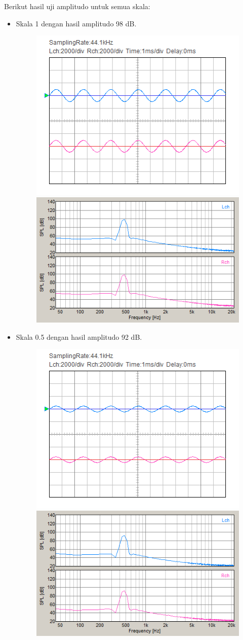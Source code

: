 \documentclass[12pt,]{article}
\begin{document}
	Berikut hasil uji amplitudo untuk semua skala:
	\begin{itemize}
		\item Skala 1 dengan hasil amplitudo 98 dB.
		\begin{figure}[H]
			\centering
			\includegraphics[width=0.45\linewidth]{result/day_4/500Hz/tone1}
			\includegraphics[width=0.45\linewidth]{result/day_4/500Hz/fft_tone1}
		\end{figure}
	
		\item Skala 0.5 dengan hasil amplitudo 92 dB.
		\begin{figure}[H]
			\centering
			\includegraphics[width=0.45\linewidth]{result/day_4/500Hz/tone05}
			\includegraphics[width=0.45\linewidth]{result/day_4/500Hz/fft_tone05}
		\end{figure}
	

\end{itemize}
\end{document}
